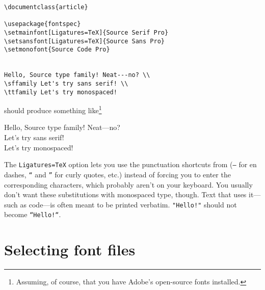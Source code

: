 \begin{leftfigure}
\begin{lstlisting}
\documentclass{article}

\usepackage{fontspec}
\setmainfont[Ligatures=TeX]{Source Serif Pro}
\setsansfont[Ligatures=TeX]{Source Sans Pro}
\setmonofont{Source Code Pro}


Hello, Source type family! Neat---no? \\
\sffamily Let's try sans serif! \\
\ttfamily Let's try monospaced!

\end{lstlisting}
\end{leftfigure}
should produce something like\footnote{Assuming, of course,
that you have Adobe's open-source fonts installed.\punckern{}}
\begin{leftfigure}
 Hello, Source type family! Neat—no? \\
 Let's try sans serif! \\
 Let's try monospaced!
\end{leftfigure}
The \verb|Ligatures=TeX| option lets you use the punctuation
shortcuts from  (\texttt{--} for en dashes,
\texttt{``} and \texttt{''} for curly quotes, etc.)
instead of forcing you to enter the corresponding characters,
which probably aren't on your keyboard.
You usually don't want these substitutions with monospaced type, though.
Text that uses it---such as code---is often meant to be printed
verbatim. \verb|"Hello!"| should not become \verb|“Hello!“|.

\section{Selecting font files}

